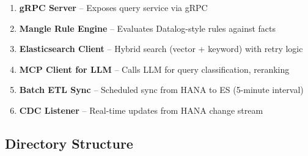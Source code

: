 \documentclass[11pt,a4paper]{article}
\begin{document}
\begin{enumerate}[noitemsep]
    \item \textbf{gRPC Server} -- Exposes query service via gRPC
    \item \textbf{Mangle Rule Engine} -- Evaluates Datalog-style rules against facts
    \item \textbf{Elasticsearch Client} -- Hybrid search (vector + keyword) with retry logic
    \item \textbf{MCP Client for LLM} -- Calls LLM for query classification, reranking
    \item \textbf{Batch ETL Sync} -- Scheduled sync from HANA to ES (5-minute interval)
    \item \textbf{CDC Listener} -- Real-time updates from HANA change stream
\end{enumerate}

\subsection{Directory Structure}
\end{document}
